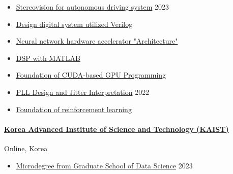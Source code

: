 \documentclass[a4paper,9pt]{extarticle}
\begin{document}
\begin{itemize}
    \item \href{https://github.com/user-attachments/assets/2d45999d-1f66-467c-b956-e16b5ed71593}{Stereovision for autonomous driving system}                            \hfill 2023
    \item \href{https://github.com/user-attachments/assets/32bfc1d6-18cf-44a4-83dc-209b4f4686ac}{Design digital system utilized Verilog}
    \item \href{https://github.com/user-attachments/assets/094a58df-f320-45fb-aba3-707f4a7fd8f7}{Neural network hardware accelerator "Architecture"}
    \item \href{https://github.com/user-attachments/assets/9f74252d-eae5-40b2-b305-ea90576100aa}{DSP with MATLAB}
    \item \href{https://github.com/user-attachments/assets/0fc8c167-bef1-4857-a664-a1b82c95e306}{Foundation of CUDA-based GPU Programming}    
\end{itemize}
\begin{itemize}
    \item \href{https://github.com/user-attachments/assets/b4e013f1-d7b8-4505-a4f5-12e270097549}{PLL Design and Jitter Interpretation}                                  \hfill 2022
    \item \href{https://github.com/user-attachments/assets/73933790-2b15-46ae-8ac2-c6eaf31d9e01}{Foundation of reinforcement learning}                                  
\end{itemize}


\paragraph{\large{\href{https://gsds.kaist.ac.kr}{Korea Advanced Institute of Science and Technology (KAIST)}}}  \hfill Online, Korea
\begin{itemize}
    \item \href{https://github.com/user-attachments/assets/b404e1df-2798-48de-8385-c9a6c7389b38}{Microdegree from Graduate School of Data Science}                      \hfill 2023
\end{itemize}
\end{document}
